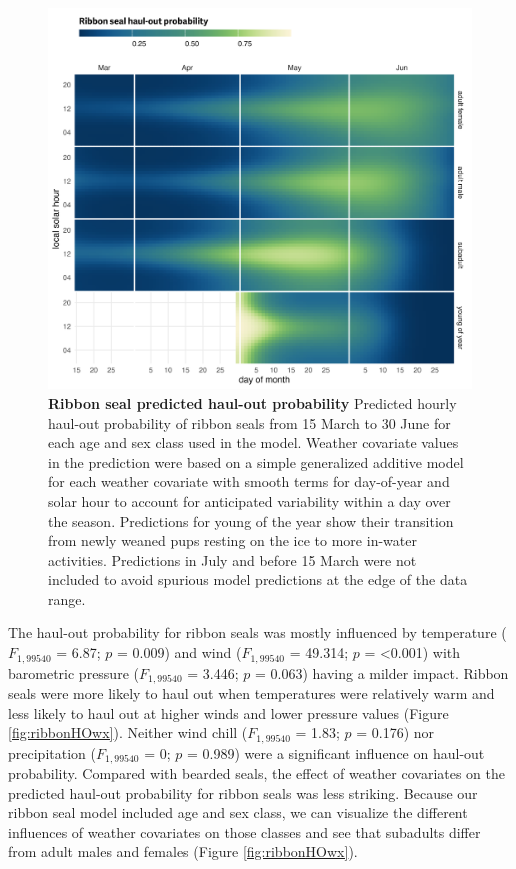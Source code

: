 \documentclass[fleqn,10pt,lineno]{wlpeerj} %
\begin{document}
\begin{figure}
\includegraphics[width=1\linewidth]{../figures/Figure-007} \caption{\textbf{Ribbon seal predicted haul-out probability} \linebreak Predicted hourly haul-out probability of ribbon seals from 15 March to 30 June for each age and sex class used in the model. Weather covariate values in the prediction were based on a simple generalized additive model for each weather covariate with smooth terms for day-of-year and solar hour to account for anticipated variability within a day over the season. Predictions for young of the year show their transition from newly weaned pups resting on the ice to more in-water activities. Predictions in July and before 15 March were not included to avoid spurious model predictions at the edge of the data range.}\label{fig:ribbonHOCal}
\end{figure}

The haul-out probability for ribbon seals was mostly influenced by
temperature
(\(F_{1,99540}\)
= 6.87; \(p\) = 0.009) and wind
(\(F_{1,99540}\)
= 49.314; \(p\) = \textless0.001) with barometric pressure
(\(F_{1,99540}\)
= 3.446; \(p\) =
0.063) having a milder impact.
Ribbon seals were more likely to haul out when temperatures were
relatively warm and less likely to haul out at higher winds and lower pressure
values (Figure \ref{fig:ribbonHOwx}). Neither wind chill
(\(F_{1,99540}\)
= 1.83; \(p\) =
0.176) nor precipitation
(\(F_{1,99540}\)
= 0; \(p\) =
0.989) were a significant
influence on haul-out probability. Compared with bearded seals, the effect of
weather covariates on the predicted haul-out probability for
ribbon seals was less striking. Because our ribbon seal model included age and sex class, we can
visualize the different influences of weather covariates on those classes and see
that subadults differ from adult males and females (Figure \ref{fig:ribbonHOwx}).
\end{document}
